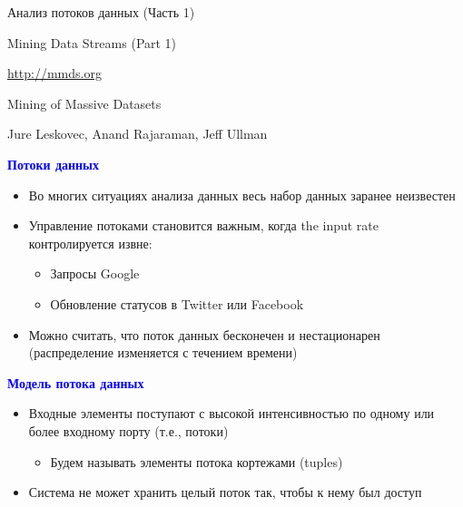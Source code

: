 \documentclass[landscape]{slides}
\begin{document}
\begin{normalsize}


\begin{slide}
\begin{center}
Анализ потоков данных (Часть 1)

Mining Data Streams (Part 1)

\url{http://mmds.org}

Mining of Massive Datasets

Jure Leskovec, Anand Rajaraman, Jeff Ullman
\end{center}
\end{slide}


\begin{slide}
\textbf{\textcolor{blue}{Потоки данных}}


\begin{itemize}
\item Во многих ситуациях анализа данных весь набор данных заранее неизвестен

\item Управление потоками становится важным, когда the input rate контролируется извне:

  \begin{itemize}
  \item Запросы Google

  \item Обновление статусов в Twitter или Facebook
  \end{itemize}

\item Можно считать, что поток данных бесконечен и нестационарен (распределение изменяется с течением времени)
\end{itemize}
\end{slide}


\begin{slide}
\textbf{\textcolor{blue}{Модель потока данных}}


\begin{itemize}
\item Входные элементы поступают с высокой интенсивностью по одному или более входному порту (т.е., потоки)

  \begin{itemize}
  \item Будем называть элементы потока кортежами (tuples)
  \end{itemize}

\item Система не может хранить целый поток так, чтобы к нему был доступ


\end{itemize}
\end{slide}
\end{normalsize}
\end{document}
